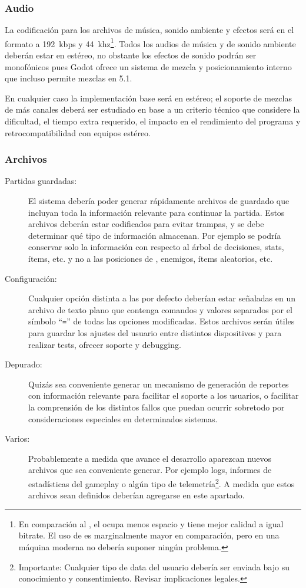 \subsubsection{Audio}
La codificación para los archivos de música, sonido ambiente y efectos será en el formato  a 192~kbps y 44~khz\footnote{En comparación al , el  ocupa menos espacio y tiene mejor calidad a igual bitrate. El uso de  es marginalmente mayor en comparación, pero en una máquina moderna no debería suponer ningún problema.}. Todos los audios de música y de sonido ambiente deberán estar en estéreo, no obstante los efectos de sonido podrán ser monofónicos pues Godot ofrece un sistema de mezcla y posicionamiento interno que incluso permite mezclas en 5.1.

En cualquier caso la implementación base será en estéreo; el soporte de mezclas de más canales deberá ser estudiado en base a un criterio técnico que considere la dificultad, el tiempo extra requerido, el impacto en el rendimiento del programa y retrocompatibilidad con equipos estéreo.

\subsubsection{Archivos}
\begin{description}
\item[Partidas guardadas:] El sistema debería poder generar rápidamente archivos de guardado que incluyan toda la información relevante para continuar la partida. Estos archivos deberán estar codificados para evitar trampas, y se debe determinar qué tipo de información almacenan. Por ejemplo se podría conservar solo la información con respecto al árbol de decisiones, stats, ítems, etc. y no a las posiciones de , enemigos, ítems aleatorios, etc.

\item[Configuración:] Cualquier opción distinta a las por defecto deberían estar señaladas en un archivo de texto plano que contenga comandos y valores separados por el símbolo “\texttt{=}” de todas las opciones modificadas.
Estos archivos serán útiles para guardar los ajustes del usuario entre distintos dispositivos y para realizar tests, ofrecer soporte y debugging.

\item[Depurado:] Quizás sea conveniente generar un mecanismo de generación de reportes con información relevante para facilitar el soporte a los usuarios, o facilitar la comprensión de los distintos fallos que puedan ocurrir sobretodo por consideraciones especiales en determinados sistemas.

\item[Varios:] Probablemente a medida que avance el desarrollo aparezcan nuevos archivos que sea conveniente generar. Por ejemplo logs, informes de estadísticas del gameplay o algún tipo de telemetría\footnote{Importante: Cualquier tipo de data del usuario debería ser enviada bajo su conocimiento y consentimiento. Revisar implicaciones legales.}. A medida que estos archivos sean definidos deberían agregarse en este apartado.
\end{description}

